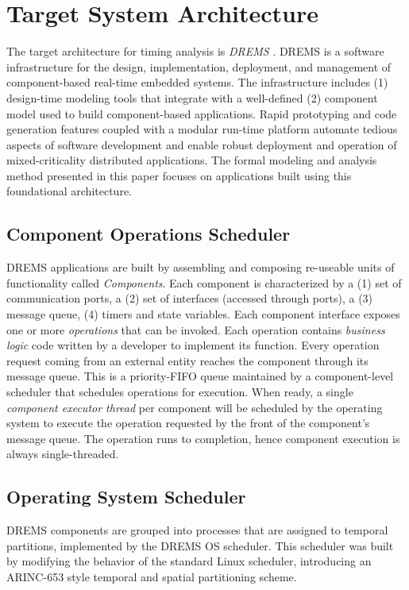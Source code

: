 \section{Target System Architecture}
\label{sec:Target_System_Architecture}
The target architecture for timing analysis is \emph{DREMS} \cite{ISIS_F6_Aerospace:12,DREMS13Software}. DREMS is a software infrastructure for the design, implementation, deployment, and management of component-based real-time embedded systems. The infrastructure includes (1) design-time modeling tools \cite{ISIS_F6_SFFMT:13} that integrate with a well-defined (2) component model \cite{ISIS_F6_ISORC:13, MoDeVVa} used to build component-based applications. Rapid prototyping and code generation features coupled with a modular run-time platform automate tedious aspects of software development and enable robust deployment and operation of mixed-criticality distributed applications. The formal modeling and analysis method presented in this paper focuses on applications built using this foundational architecture. 

\subsection{Component Operations Scheduler}

DREMS applications are built by assembling and composing re-useable units of functionality called \emph{Components}. Each component is characterized by a (1) set of communication ports, a (2) set of interfaces (accessed through ports), a (3) message queue, (4) timers and state variables. Each component interface exposes one or more \emph{operations} that can be invoked. Each operation contains \emph{business logic} code written by a developer to implement its function. Every operation request coming from an external entity reaches the component through its message queue. This is a priority-FIFO queue maintained by a component-level scheduler that schedules operations for execution. When ready, a single \emph{component executor thread} per component will be scheduled by the operating system to execute the operation requested by the front of the component's message queue. The operation runs to completion, hence component execution is always single-threaded. 


\subsection{Operating System Scheduler}
DREMS components are grouped into processes that are assigned to temporal partitions, implemented by the DREMS OS scheduler. This scheduler was built by modifying the behavior of the standard Linux scheduler, introducing an ARINC-653 \cite{ARINC-653} style temporal and spatial partitioning scheme. 

